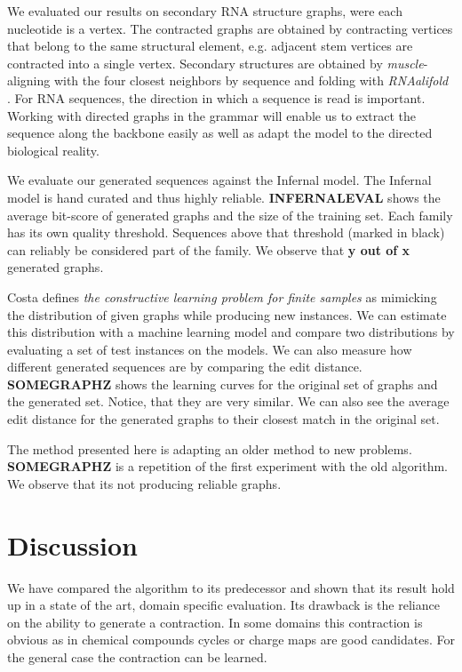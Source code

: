 \documentclass{article}
\begin{document}
We evaluated our results on secondary RNA structure graphs, were each 
nucleotide is a vertex. The contracted graphs are obtained by 
contracting vertices that belong to the same structural element,
e.g. adjacent stem vertices are contracted into a single vertex.
Secondary structures are obtained by \emph{muscle}-aligning \cite{muscle} with 
the four closest neighbors by sequence and folding with \emph{RNAalifold}
\cite{rnaalifold}.  For RNA sequences, the direction in which a sequence
is read is important.  Working with directed graphs in the grammar
will enable us to extract the sequence along the backbone easily as well
as adapt the model to the directed biological reality.

We evaluate our generated sequences against the Infernal model.
The Infernal model is hand curated and thus highly reliable.
 \textbf{INFERNALEVAL} shows the average bit-score of generated graphs
and the size of the training set. Each family has its own quality threshold.
Sequences above that threshold (marked in black) can reliably be considered
part of the family. We observe that \textbf{y out of x} generated graphs.

Costa \cite{costa14} defines \emph{the constructive learning problem for 
finite samples} 
as mimicking the distribution of given graphs while producing new instances.
We can estimate this distribution with a machine learning
model and compare two distributions by evaluating a set of test instances
on the models. We can also measure how different generated sequences
are by comparing the edit distance.
\textbf{SOMEGRAPHZ} shows the learning curves for the original set
of graphs and the generated set. Notice, that they are very similar.
We can also see the average edit distance for the generated graphs 
to their closest match in the original set.

The method presented here is adapting an older method to new problems.
\textbf{SOMEGRAPHZ} is a repetition of the first experiment with 
the old algorithm. We observe that its not producing reliable
graphs.

\section{Discussion} 
We have compared the algorithm to its predecessor and shown
that its result hold up in a state of the art, domain specific
evaluation. Its drawback is the reliance on the ability to 
generate a contraction. In some domains this contraction is 
obvious as in chemical compounds cycles or charge maps are good candidates.
For the general case the contraction can be learned.


\end{document}
